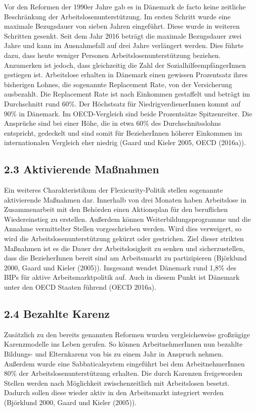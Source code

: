 \documentclass[ngerman,]{article}
\begin{document}
Vor den Reformen der 1990er Jahre gab es in Dänemark de facto keine
zeitliche Beschränkung der Arbeitslosenunterstützung. Im ersten Schritt
wurde eine maximale Bezugsdauer von sieben Jahren eingeführt. Diese
wurde in weiteren Schritten gesenkt. Seit dem Jahr 2016 beträgt die
maximale Bezugsdauer zwei Jahre und kann im Ausnahmefall auf drei Jahre
verlängert werden. Dies führte dazu, dass heute weniger Personen
Arbeitslosenunterstützung beziehen. Anzumerken ist jedoch, dass
gleichzeitig die Zahl der SozialhilfeempfängerInnen gestiegen ist.
Arbeitslose erhalten in Dänemark einen gewissen Prozentsatz ihres
bisherigen Lohnes, die sogenannte Replacement Rate, von der Versicherung
ausbezahlt. Die Replacement Rate ist nach Einkommen gestaffelt und
beträgt im Durchschnitt rund 60\%. Der Höchstsatz für
NiedrigverdienerInnen kommt auf 90\% in Dänemark. Im OECD-Vergleich sind
beide Prozentsätze Spitzenreiter. Die Ansprüche sind bei einer Höhe, die
in etwa 60\% des Durchschnitsslohns entspricht, gedeckelt und sind somit
für BezieherInnen höherer Einkommen im internationalen Vergleich eher
niedrig (Gaard und Kieler 2005, OECD (2016a)).

\subsection{2.3 Aktivierende Maßnahmen}\label{aktivierende-manahmen}

Ein weiteres Charakteristikum der Flexicurity-Politik stellen sogenannte
aktivierende Maßnahmen dar. Innerhalb von drei Monaten haben Arbeitslose
in Zusammenarbeit mit den Behörden einen Aktionsplan für den beruflichen
Wiedereinstieg zu erstellen. Außerdem können Weiterbildungsprogramme und
die Annahme vermittelter Stellen vorgeschrieben werden. Wird dies
verweigert, so wird die Arbeitslosenunterstützung gekürzt oder
gestrichen. Ziel dieser strikten Maßnahmen ist es die Dauer der
Arbeitslosigkeit zu senken und sicherzustellen, dass die BezieherInnen
bereit sind am Arbeitsmarkt zu partizipieren (Björklund 2000, Gaard und
Kieler (2005)). Insgesamt wendet Dänemark rund 1,8\% des BIPs für aktive
Arbeitsmarktpolitik auf. Auch in diesem Punkt ist Dänemark unter den
OECD Staaten führend (OECD 2016a).

\subsection{2.4 Bezahlte Karenz}\label{bezahlte-karenz}

Zusätzlich zu den bereits genannten Reformen wurden vergleichsweise
großzügige Karenzmodelle ins Leben gerufen. So können ArbeitnehmerInnen
nun bezahlte Bildungs- und Elternkarenz von bis zu einem Jahr in
Anspruch nehmen. Außerdem wurde eine Sabbaticalsystem eingeführt bei dem
ArbeitnehmerInnen 80\% der Arbeitslosenunterstützung erhalten. Die durch
Karenzen freigeworden Stellen werden nach Möglichkeit zwischenzeitlich
mit Arbeitslosen besetzt. Dadurch sollen diese wieder aktiv in den
Arbeitsmarkt integriert werden (Björklund 2000, Gaard und Kieler
(2005)).
\end{document}
